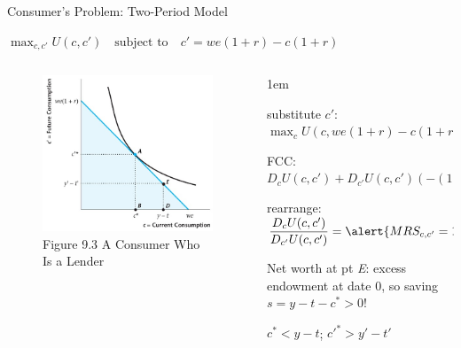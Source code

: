 \documentclass[11pt,aspectratio=43]{beamer}
\let\olditemize=\itemize
\let\endolditemize=\enditemize
\renewenvironment{itemize}{\olditemize \itemsep1em}{\endolditemize}
\theoremstyle{definition}
\begin{document}
\begin{frame}{Consumer's Problem: Two-Period Model}
\label{slide:Consumer_s_Problem__Two_Period_Model}
    \begin{center}
        $\displaystyle \max_{c, c'} U( c, c' ) \quad \text{subject to} \quad c' = we( 1+r ) - c( 1+r )$
    \end{center}
    \begin{columns}
        \begin{column}{0.4\textwidth}
            \begin{figure}
                \caption{\scriptsize Figure 9.3 A Consumer Who Is a Lender}
                \includegraphics[width=\textwidth]{./figures/Figure9_3.jpg}
            \end{figure}
        \end{column}
        \begin{column}{0.6\textwidth}
            \begin{itemize}
                \item substitute $ c' $: $ \displaystyle \max_{c} U( c, we( 1+r ) - c( 1+r ) ) $
                \item FCC: $ \displaystyle D_{c} U( c, c' ) + D_{c'} U( c, c' ) ( -( 1+r ) ) = 0 $
                \item rearrange: $ \displaystyle \frac{D_{c}U( c, c' )}{D_{c'}U( c, c' )} = \alert{MRS_{c, c'} = 1+r} $
                \item Net worth at pt \textit{E}: excess endowment at date 0, so saving $ s = y - t - c^{*} > 0 $!
                \item $ c^{*} < y - t $; $ c'^{*} > y' - t'$
            \end{itemize}
        \end{column}
    \end{columns}
\end{frame}
\end{document}
